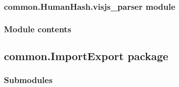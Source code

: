 \documentclass[letterpaper,10pt,english]{sphinxmanual}
\begin{document}
\begin{fulllineitems}

\begin{fulllineitems}
\label{\detokenize{common.HumanHash:common.HumanHash.urlifier.Referencer.store_value}}
\end{fulllineitems}


\end{fulllineitems}


\begin{fulllineitems}
\label{\detokenize{common.HumanHash:common.HumanHash.urlifier.main}}
\end{fulllineitems}



\subsubsection{common.HumanHash.visjs\_parser module}
\label{\detokenize{common.HumanHash:common-humanhash-visjs-parser-module}}

\subsubsection{Module contents}
\label{\detokenize{common.HumanHash:module-common.HumanHash}}\label{\detokenize{common.HumanHash:module-contents}}

\subsection{common.ImportExport package}
\label{\detokenize{common.ImportExport:common-importexport-package}}\label{\detokenize{common.ImportExport::doc}}

\subsubsection{Submodules}
\label{\detokenize{common.ImportExport:submodules}}
\end{document}
